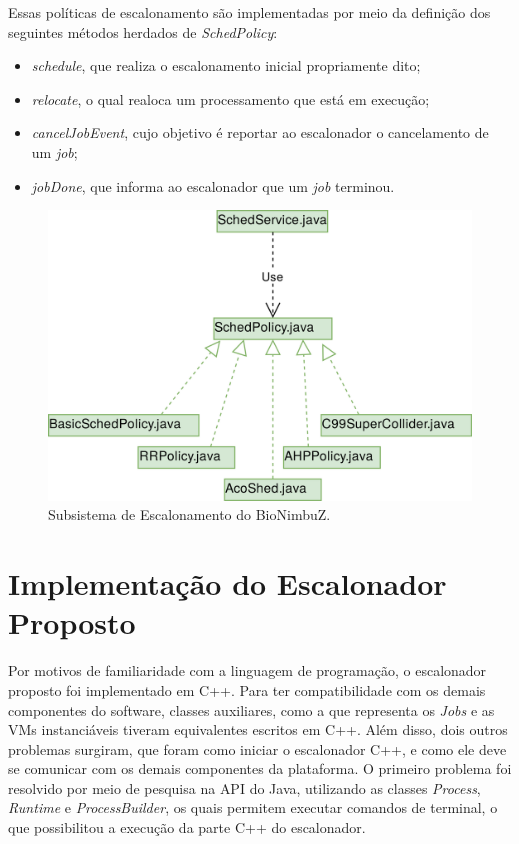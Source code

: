 Essas políticas de escalonamento são implementadas por meio da definição dos seguintes métodos herdados de \textit{SchedPolicy}:
\begin{itemize}
	\item \textit{schedule}, que realiza o escalonamento inicial propriamente dito;
	\item \textit{relocate}, o qual realoca um processamento que está em execução;
	\item \textit{cancelJobEvent}, cujo objetivo é reportar ao escalonador o cancelamento de um \textit{job};
	\item \textit{jobDone}, que informa ao escalonador que um \textit{job} terminou.
\end{itemize}

\begin{figure}[htbp]
	\centerline{\includegraphics[width=12cm]{img/ArquiteturaAntesHoriz.png}}
	\caption{Subsistema de Escalonamento do BioNimbuZ.}
	\label{ArquiteturaAtual}
\end{figure}


\section{Implementação do Escalonador Proposto}

Por motivos de familiaridade com a linguagem de programação, o escalonador proposto foi implementado em C++. Para ter compatibilidade com os demais componentes do software, classes auxiliares, como a que representa os \textit{Jobs} e as \acrshort{VM}s instanciáveis tiveram equivalentes escritos em C++. Além disso, dois outros problemas surgiram, que foram como iniciar o escalonador C++, e como ele deve se comunicar com os demais componentes da plataforma. O primeiro problema foi resolvido por meio de pesquisa na \acrfull{API} do Java, utilizando as classes \textit{Process}\cite{JavaProcess}, \textit{Runtime}\cite{JavaRuntime} e \textit{ProcessBuilder}\cite{JavaProcessBuilder}, os quais permitem executar comandos de terminal, o que possibilitou a execução da parte C++ do escalonador.

